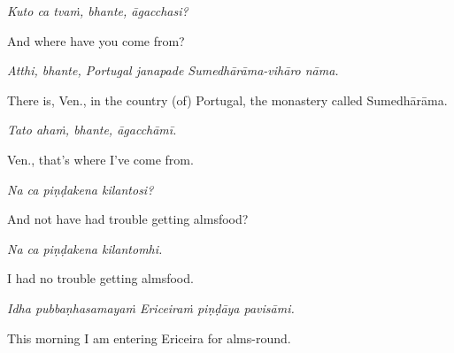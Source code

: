 \documentclass[11pt,oneside]{memoir}
\begin{document}
\emph{Kuto ca tvaṁ, bhante, āgacchasi?}

And where have you come from?

\emph{Atthi, bhante, Portugal janapade Sumedhārāma-vihāro nāma.}

There is, Ven., in the country (of) Portugal, the monastery called Sumedhārāma.

\emph{Tato ahaṁ, bhante, āgacchāmī.}

Ven., that's where I've come from.

\emph{Na ca piṇḍakena kilantosi?}

And not have had trouble getting almsfood?

\emph{Na ca piṇḍakena kilantomhi.}

I had no trouble getting almsfood.

\emph{Idha pubbaṇhasamayaṁ Ericeiraṁ piṇḍāya pavisāmi.}

This morning I am entering Ericeira for alms-round.

\clearpage
\end{document}
